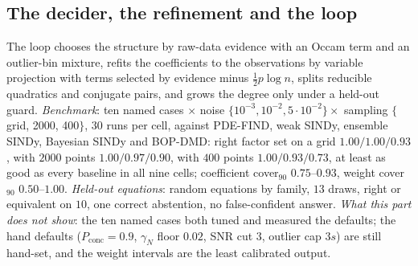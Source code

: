 \documentclass[11pt]{article}
\theoremstyle{plain}
\theoremstyle{definition}
\theoremstyle{remark}
\newcommand{\gN}{\gamma_{N}}                %
\begin{document}
\subsection{The decider, the refinement and the loop}\label{sec:decider}
The loop chooses the structure by raw-data evidence with an Occam term and an outlier-bin mixture, refits the coefficients to the observations by variable projection with terms selected by evidence minus $\tfrac12p\log n$, splits reducible quadratics and conjugate pairs,
and grows the degree only under a held-out guard. \emph{Benchmark}: ten named cases $\times$ noise $\{10^{-3},10^{-2},5\cdot10^{-2}\}\times$ sampling $\{$grid, 2000, 400$\}$, $30$ runs per cell, against PDE-FIND, weak SINDy, ensemble SINDy, Bayesian SINDy and BOP-DMD:
right factor set on a grid $1.00/1.00/0.93$, with $2000$ points $1.00/0.97/0.90$, with $400$ points $1.00/0.93/0.73$, at least as good as every baseline in all nine cells; coefficient cover$_{90}$ $0.75$--$0.93$, weight cover$_{90}$ $0.50$--$1.00$.
\emph{Held-out equations}: random equations by family, $13$ draws, right or equivalent on $10$, one correct abstention, no false-confident answer.
\emph{What this part does not show}: the ten named cases both tuned and measured the defaults; the hand defaults ($P_{\mathrm{conc}}=0.9$, $\gN$ floor $0.02$, SNR cut $3$, outlier cap $3s$) are still hand-set, and the weight intervals are the least calibrated output.

\end{document}
